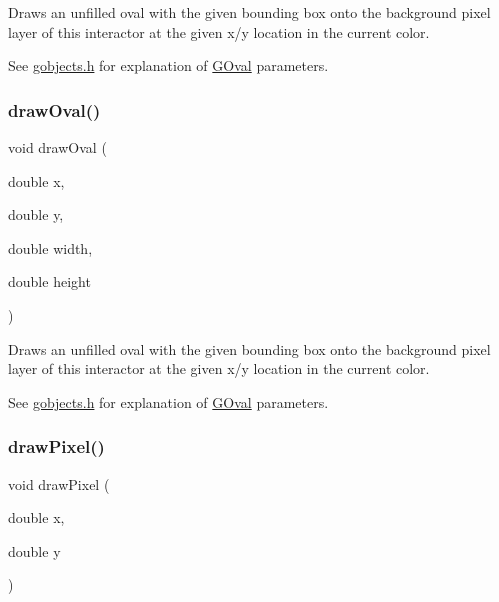 Draws an unfilled oval with the given bounding box onto the background pixel layer of this interactor at the given x/y location in the current color. 

See \mbox{\hyperlink{gobjects_8h_source}{gobjects.\+h}} for explanation of \mbox{\hyperlink{classGOval}{G\+Oval}} parameters. \mbox{\label{classGDrawingSurface_aa5b1cf902e578907da3c63060686354e}} 
\subsubsection{\texorpdfstring{draw\+Oval()}{drawOval()}\hspace{0.1cm}{\footnotesize\ttfamily [2/2]}}
{\footnotesize\ttfamily void draw\+Oval (\begin{DoxyParamCaption}\item[{double}]{x,  }\item[{double}]{y,  }\item[{double}]{width,  }\item[{double}]{height }\end{DoxyParamCaption})\hspace{0.3cm}{\ttfamily [virtual]}}



Draws an unfilled oval with the given bounding box onto the background pixel layer of this interactor at the given x/y location in the current color. 

See \mbox{\hyperlink{gobjects_8h_source}{gobjects.\+h}} for explanation of \mbox{\hyperlink{classGOval}{G\+Oval}} parameters. \mbox{\label{classGDrawingSurface_a0c1e2923d8d163d62d0896d8c5cfa191}} 
\subsubsection{\texorpdfstring{draw\+Pixel()}{drawPixel()}\hspace{0.1cm}{\footnotesize\ttfamily [1/3]}}
{\footnotesize\ttfamily void draw\+Pixel (\begin{DoxyParamCaption}\item[{double}]{x,  }\item[{double}]{y }\end{DoxyParamCaption})\hspace{0.3cm}{\ttfamily [virtual]}}



